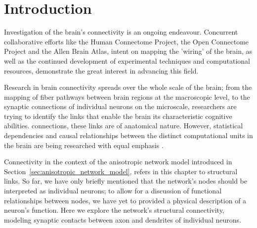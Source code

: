 
\section{Introduction}

Investigation 
of the brain's connectivity is an ongoing endeavour.  Concurrent
collaborative efforts like the Human Connectome Project, the Open
Connectome Project and the Allen Brain Atlas, intent on mapping the
'wiring' of the brain, as well as the continued development of
experimental techniques and computational resources, demonstrate
the
great interest in advancing this field.

Research in brain connectivity spreads over the whole scale
of the brain; from the mapping of fiber pathways between brain regions
at the macroscopic level, to the synaptic connections of individual
neurons on the microscale, researchers are trying to identify the
links that enable the brain its characteristic cognitive abilities.
connections, these links are of anatomical nature. However,
statistical dependencies and causal relationships between the distinct
computational units in the brain are being researched with equal
emphasis \parencite{Scholarpedia-BrainConnectivity}.

Connectivity in the context of the anisotropic network model
introduced in Section~\ref{sec:anisotropic_network_model}, refers in
this chapter to structural links. So far, we have only briefly
mentioned that the network's nodes should be interpreted as individual
neurons; to allow for a discussion of functional relationships between
nodes, we have yet to provided a physical description of a neuron's
function. Here we explore the network's structural connectivity,
modeling synaptic contacts between axon and dendrites of individual
neurons.


